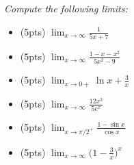 \documentclass[12pt]{article}
\begin{document}
\bigskip
{\problem \em Compute the following limits:}
\begin{itemize}
  \item[] (5pts) $\displaystyle{\lim_{x\to \infty} \frac{1}{5x+7}}$
  \vspace{2cm}
  \item[] (5pts) $\displaystyle{\lim_{x\to\infty} \frac{1-x-x^2}{5x^2-9}}$
  \vspace{2cm}
  \item[] (5pts) $\displaystyle{\lim_{x\to 0+} \ln x + \frac{3}{x}}$
  \vspace{2cm}
  \item[] (5pts) $\displaystyle{\lim_{x\to\infty} \frac{12 x^3}{5 e^x}}$
  \vspace{2cm}
  \item[] (5pts) $\displaystyle{\lim_{x\to \pi/2^{+}} \frac{1-\sin x}{\cos x}}$
  \vspace{2cm}
  \item[] (5pts) $\displaystyle{\lim_{x\to\infty} \Big(1-\frac{3}{x} \Big)^{x}}$
\end{itemize}
\end{document}
